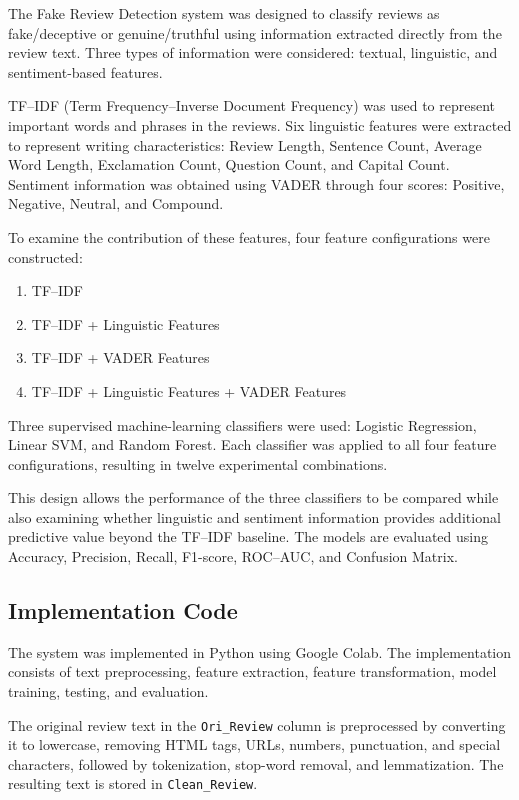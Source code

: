 \documentclass[12pt,a4paper]{report}
\begin{document}
The Fake Review Detection system was designed to classify reviews as
fake/deceptive or genuine/truthful using information extracted directly
from the review text. Three types of information were considered:
textual, linguistic, and sentiment-based features.

TF--IDF (Term Frequency--Inverse Document Frequency) was used to
represent important words and phrases in the reviews. Six linguistic
features were extracted to represent writing characteristics: Review
Length, Sentence Count, Average Word Length, Exclamation Count,
Question Count, and Capital Count. Sentiment information was obtained
using VADER through four scores: Positive, Negative, Neutral, and
Compound.

To examine the contribution of these features, four feature
configurations were constructed:

\begin{enumerate}
    \item TF--IDF
    \item TF--IDF + Linguistic Features
    \item TF--IDF + VADER Features
    \item TF--IDF + Linguistic Features + VADER Features
\end{enumerate}

Three supervised machine-learning classifiers were used: Logistic
Regression, Linear SVM, and Random Forest. Each classifier was applied
to all four feature configurations, resulting in twelve experimental
combinations.

This design allows the performance of the three classifiers to be
compared while also examining whether linguistic and sentiment
information provides additional predictive value beyond the TF--IDF
baseline. The models are evaluated using Accuracy, Precision, Recall,
F1-score, ROC--AUC, and Confusion Matrix.

\subsection{Implementation Code}

The system was implemented in Python using Google Colab. The
implementation consists of text preprocessing, feature extraction,
feature transformation, model training, testing, and evaluation.

The original review text in the \texttt{Ori\_Review} column is
preprocessed by converting it to lowercase, removing HTML tags, URLs,
numbers, punctuation, and special characters, followed by tokenization,
stop-word removal, and lemmatization. The resulting text is stored in
\texttt{Clean\_Review}.
\end{document}
